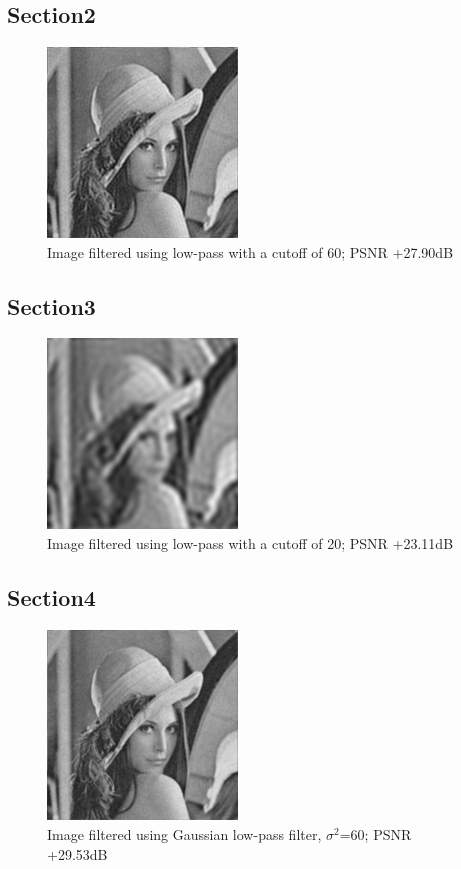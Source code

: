\documentclass[article, 1.5space, letterpaper, 12pt, oneside, header, footer]{SydeClass}
\begin{document}
\subsection{Section2}
\begin{figure}[ht]
\centering
	\includegraphics[width=0.45\textwidth]{question5/2_lena_LFP_60}
	\caption{Image filtered using low-pass with a cutoff of 60; PSNR +27.90dB}
\end{figure}

\subsection{Section3}
\begin{figure}[ht]
\centering
	\includegraphics[width=0.45\textwidth]{question5/3_lena_LFP_20}
	\caption{Image filtered using low-pass with a cutoff of 20; PSNR +23.11dB}
\end{figure}

\subsection{Section4}
\begin{figure}[ht]
\centering
	\includegraphics[width=0.45\textwidth]{question5/4_lena_LFP_gauss60}
	\caption{Image filtered using Gaussian low-pass filter, $\sigma^2$=60; PSNR +29.53dB}
\end{figure}
\end{document}
